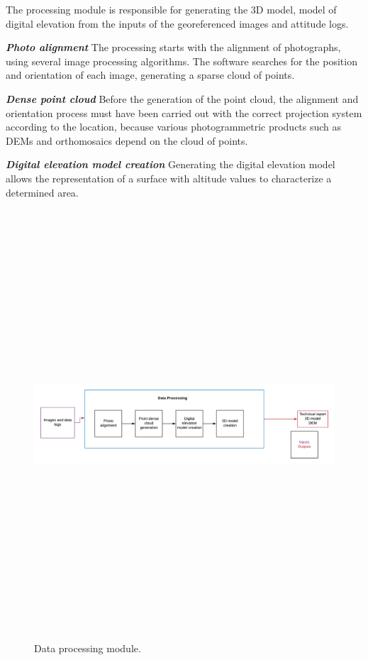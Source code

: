 The processing module is responsible for generating the 3D model, model of digital elevation from the inputs of the  georeferenced images and  attitude logs.


\textit{\textbf{Photo alignment}} \newline
The processing starts with the alignment of photographs, using several image processing algorithms. The software searches for the position and orientation of each image, generating a sparse cloud of points.

\textit{\textbf{Dense point cloud}} \newline
Before the generation of the point cloud, the alignment and orientation process must have been carried out with the correct projection system according to the location, because various photogrammetric products such as DEMs and orthomosaics depend on the cloud of points.

\textit{\textbf{Digital elevation model creation}} \newline
Generating the digital elevation model allows the representation of a surface with altitude values to characterize a determined area.

\begin{figure}[h]
\centering
\includegraphics[width=16cm,height=16cm,keepaspectratio]{imagenes/DataProcessing.png}
\caption{Data processing module.}
\label{fig:DataProcessing}
\end{figure}

